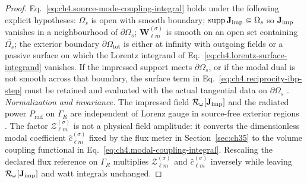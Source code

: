 \begin{proof}
Eq.~\eqref{eq:ch4.source-mode-coupling-integral} holds under the following explicit hypotheses:
$\Omega_s$ is open with smooth boundary; $\operatorname{supp}\mathbf{J}_{\mathrm{imp}}\Subset\Omega_s$ so $\mathbf{J}_{\mathrm{imp}}$ vanishes in a neighbourhood of $\partial\Omega_s$;
$\mathbf{W}_{\ell m}^{(\sigma)}$ is smooth on an open set containing $\overline{\Omega_s}$; the exterior boundary
$\partial\Omega_{\mathrm{tot}}$ is either at infinity with outgoing fields or a passive surface on which the Lorentz
integrand of Eq.~\eqref{eq:ch4.lorentz-surface-integrand} vanishes.
If the impressed support meets $\partial\Omega_s$, or if the modal dual is not smooth across that boundary, the surface term in
Eq.~\eqref{eq:ch4.reciprocity-ibp-step} must be retained and evaluated with the actual tangential data on $\partial\Omega_s$
\cite{collin2001,harrington2001}.
\emph{Normalization and invariance.} The impressed field $\mathcal{R}_\omega[\mathbf{J}_{\mathrm{imp}}]$ and the radiated power
$P_{\mathrm{rad}}$ on $\Gamma_R$ are independent of Lorenz gauge in source-free exterior regions
\cite{stratton1941}. The factor $\mathcal{Z}_{\ell m}^{(\sigma)}$ is not a physical field amplitude: it converts the
dimensionless modal coefficient $\widehat{c}_{\ell m}^{(\sigma)}$ fixed by the flux meter in Section~\ref{sec:ch35}
to the volume coupling functional in Eq.~\eqref{eq:ch4.modal-coupling-integral}.
Rescaling the declared flux reference on $\Gamma_R$ multiplies $\mathcal{Z}_{\ell m}^{(\sigma)}$ and
$\widehat{c}_{\ell m}^{(\sigma)}$ inversely while leaving $\mathcal{R}_\omega[\mathbf{J}_{\mathrm{imp}}]$ and watt integrals unchanged.
\end{proof}

